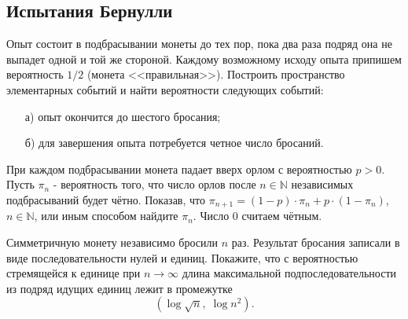 
\subsection{Испытания Бернулли}

\begin{problem}
Опыт состоит в подбрасывании монеты до тех пор, пока два раза подряд она не выпадет одной и той же стороной. Каждому 
возможному исходу опыта припишем вероятность $1/2$ (монета <<правильная>>). 
Построить пространство элементарных событий и найти вероятности следующих событий: 
\begin{enumerate}
\item[а)] опыт окончится до шестого бросания; 
\item[б)] для завершения опыта потребуется четное число бросаний. 
\end{enumerate}
\end{problem}


\begin{problem}
При каждом подбрасывании монета падает вверх орлом с вероятностью $p>0$. Пусть $\pi _{n} $ - вероятность того, что число орлов после $n\in {\mathbb N}$ независимых подбрасываний будет чётно. Показав, что $\pi _{n+1} =\left(1-p\right)\cdot \pi _{n} +p\cdot \left(1-\pi _{n} \right)$, $n\in {\mathbb N}$, или иным способом найдите $\pi _{n} $. Число $0$ считаем чётным.
\end{problem}

\begin{problem}
Симметричную монету независимо бросили $n$ раз. Результат бросания записали в виде последовательности нулей и единиц. Покажите, что с вероятностью стремящейся к единице при $n\to \infty $ длина максимальной подпоследовательности из подряд идущих единиц лежит в промежутке
\[\left(\log \sqrt{n} ,\; \log n^{2} \right).\] 
\end{problem}
